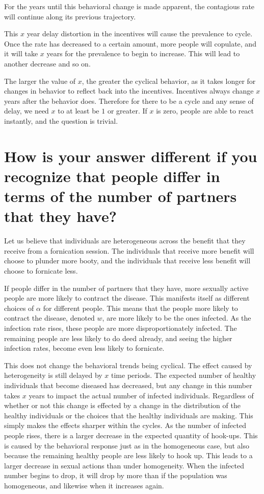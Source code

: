 \documentclass[12pt]{paper}
\begin{document}
For the years until this behavioral change is made apparent, the
contagious rate will continue along its previous trajectory. 

This $x$ year delay distortion in the incentives will cause the
prevalence to cycle. Once the rate has decreased to a certain amount,
more people will copulate, and it will take $x$ years for the
prevalence to begin to increase. This will lead to another decrease
and so on.

The larger the value of $x$, the greater the cyclical behavior, as it
takes longer for changes in behavior to reflect back into the
incentives. Incentives always change $x$ years after the behavior
does. Therefore for there to be a cycle and any sense of delay, we
need $x$ to at least be $1$ or greater. If $x$ is zero, people are
able to react instantly, and the question is trivial.

\section*{How is your answer different if you recognize that people
  differ in terms of the number of partners that they have?}

Let us believe that individuals are heterogeneous across the benefit that
they receive from a fornication session. The individuals that receive
more benefit will choose to plunder more booty, and the individuals
that receive less benefit will choose to fornicate less. 

If people differ in the number of partners that they have, more
sexually active people are more likely to contract the disease. This
manifests itself as different choices of $\alpha$ for different
people. This means that the people more likely to contract the
disease, denoted $w$, are more likely to be the ones infected. As the
infection rate rises, these people are more disproportionately
infected. The remaining people are less likely to do deed already, and
seeing the higher infection rates, become even less likely to
fornicate.


This does not change the behavioral trends being cyclical. The effect
caused by heterogeneity is still delayed by $x$ time periods. The
expected number of healthy individuals that become diseased has
decreased, but any change in this number takes $x$ years to impact the
actual number of infected individuals. Regardless of whether or not
this change is effected by a change in the distribution of the healthy
individuals or the choices that the healthy individuals are
making. This simply makes the effects sharper within the cycles. As
the number of infected people rises, there is a larger decrease in the
expected quantity of hook-ups. This is caused by the behavioral
response just as in the homogeneous case, but also because the
remaining healthy people are less likely to hook up. This leads to a
larger decrease in sexual actions than under homogeneity. When
the infected number begins to drop, it will drop by more than if the
population was homogeneous, and likewise when it increases again.
\end{document}
